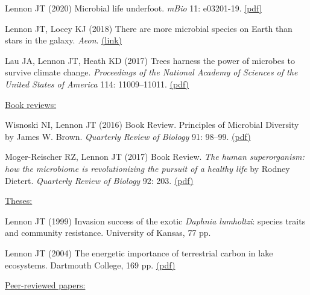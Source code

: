 \documentclass[11pt]{article}
\begin{document}
\begin{etaremune}
\item Lennon JT (2020) Microbial life underfoot. \textit{mBio} 11: e03201-19. \href{https://lennonlab.github.io/assets/publications/Lennon_2020.pdf}{[pdf]}

\item Lennon JT, Locey KJ (2018) There are more microbial species on Earth than stars in the galaxy. \textit{Aeon}. \href{https://aeon.co/ideas/there-are-more-microbial-species-on-earth-than-stars-in-the-sky}{(link)}

\item Lau JA, Lennon JT, Heath KD (2017) Trees harness the power of microbes to survive climate change. \textit{Proceedings of the National Academy of Sciences of the United States of America} 114: 11009–11011. \href{https://lennonlab.github.io/assets/publications/Lau_etal_2017.pdf}{(pdf)}

\vspace{1em}
\item[] \textnormal{\underline{Book reviews:}}

\item Wisnoski NI, Lennon JT (2016) Book Review. Principles of Microbial Diversity by James W. Brown. \textit{Quarterly Review of Biology} 91: 98–99. \href{https://lennonlab.github.io/assets/publications/Wisnoski_Lennon_2016.pdf}{(pdf)}

\item Moger-Reischer RZ, Lennon JT (2017) Book Review. \textit{The human superorganism: how the microbiome is revolutionizing the pursuit of a healthy life} by Rodney Dietert. \textit{Quarterly Review of Biology} 92: 203. \href{https://lennonlab.github.io/assets/publications/Moger-Reicher_Lennon_2017.pdf}{(pdf)}

\vspace{1em}
\item[] \textnormal{\underline{Theses:}}

\item Lennon JT (1999) Invasion success of the exotic \textit{Daphnia lumholtzi}: species traits and community resistance. University of Kansas, 77 pp.

\item Lennon JT (2004) The energetic importance of terrestrial carbon in lake ecosystems. Dartmouth College, 169 pp. \href{https://lennonlab.github.io/assets/publications/Lennon_2004_Thesis.pdf}{(pdf)}

\vspace{1em}
\item[] \textnormal{\underline{Peer-reviewed papers:}}


\end{etaremune}
\end{document}

